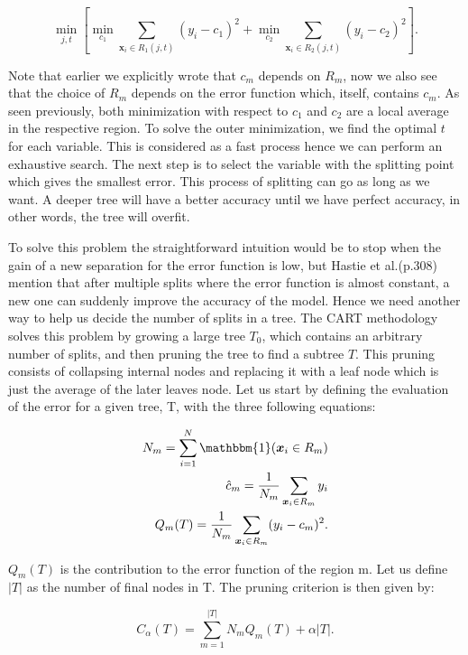 \documentclass[a4paper,12pt]{article}
\numberwithin{equation}{section}
\begin{document}
\begin{equation}\label{eq:6}
\min_{j,t}[\min_{c_1}\sum_{\boldsymbol{x}_i \in R_1(j,t)}(y_i-c_1)^2 + \min_{c_2}\sum_{\boldsymbol{x}_i \in R_2(j,t)}(y_i-c_2)^2].
\end{equation} 


Note that earlier we explicitly wrote that $c_m$ depends on $R_m$, now we also see that the choice of $R_m$ depends on the error function which, itself, contains $c_m$. As seen previously, both minimization with respect to $c_1$ and $c_2$ are a local average in the respective region. To solve the outer minimization, we find the optimal $t$ for each variable. This is considered as a fast process hence we can perform an exhaustive search. The next step is to select the variable with the splitting point which gives the smallest error. This process of splitting can go as long as we want. A deeper tree will have a better accuracy until we have perfect accuracy, in other words, the tree will overfit.\par
To solve this problem the straightforward intuition would be to stop when the gain of a new separation for the error function is low, but Hastie et al.(p.308) mention that after multiple splits where the error function is almost constant, a new one can suddenly improve the accuracy of the model. Hence we need another way to help us decide the number of splits in a tree. The CART methodology solves this problem by growing a large tree $T_0$, which contains an arbitrary number of splits, and then pruning the tree to find a subtree $T$. This pruning consists of collapsing internal nodes and replacing it with a leaf node which is just the average of the later leaves node. Let us start by defining the evaluation of the error for a given tree, T, with the three following equations:

\begin{align*}
N_m = \sum_{i=1}^N \mathbbm{1}(\boldsymbol{x}_i \in R_m) \\
\hat{c}_m = \frac{1}{N_m}\sum_{\boldsymbol{x}_i \in R_m}y_i \\
Q_m(T) = \frac{1}{N_m}\sum_{\boldsymbol{x}_i \in R_m}(y_i-c_m)^2.
\end{align*} 

$Q_m(T)$ is the contribution to the error function of the region m. Let us define $|T|$ as the number of final nodes in T. The pruning criterion is then given by:

\begin{equation}\label{eq:7}
C_{\alpha}(T) = \sum_{m=1}^{|T|}N_mQ_m(T)+\alpha|T|.
\end{equation}
\end{document}
